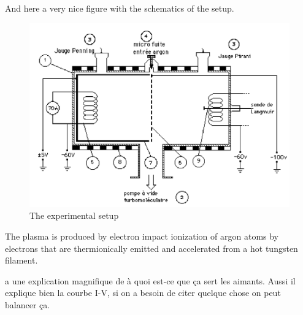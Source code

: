And here a very nice figure with the schematics of the setup.
\begin{figure}
    \centering
    \includegraphics[width=12cm]{figures/experimental-setup.png}
    \caption{The experimental setup}
    \label{fig:experimental_setup}
\end{figure}

The plasma is produced by electron impact ionization
of argon atoms by electrons that are thermionically emitted and accelerated
from a hot tungsten filament.

\cite{merlino_understanding_2007} a une explication magnifique de à quoi est-ce que ça sert les aimants.
Aussi il explique bien la courbe I-V, si on a besoin de citer quelque chose on peut balancer ça.